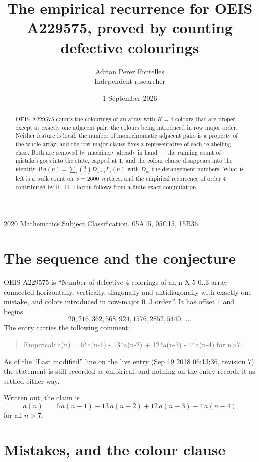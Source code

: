 \documentclass[11pt,a4paper]{article}
\title{The empirical recurrence for OEIS A229575, proved by counting defective colourings}
\author{Adrian Perez Fontelles\\ \small Independent researcher}
\date{1 September 2026}
\theoremstyle{plain}
\theoremstyle{definition}
\begin{document}
\maketitle

\begin{abstract}
OEIS A229575 counts the colourings of an array with $K=4$ colours that are proper except at
exactly one adjacent pair, the colours being introduced in row
major order. Neither feature is local: the number of monochromatic adjacent pairs is a
property of the whole array, and the row major clause fixes a representative of each
relabelling class. Both are removed by machinery already in hand --- the running count of
mistakes goes into the state, capped at $1$, and the colour clause disappears into the
identity $4!\,a(n)=\sum_i\binom{4}{i}D_{4-i}L_i(n)$ with $D_m$ the derangement
numbers. What is left is a walk count on $S=2600$ vertices, and the empirical recurrence of
order $4$ contributed by R.~H.~Hardin follows from a finite exact computation.
\end{abstract}

\noindent\small 2020 Mathematics Subject Classification. 05A15, 05C15, 15B36.\normalsize

\section{The sequence and the conjecture}

OEIS A229575 is ``Number of defective 4-colorings of an n X 5 0..3 array connected horizontally, vertically, diagonally and antidiagonally with exactly one mistake, and colors introduced in row-major 0..3 order.''. It has offset $1$ and begins
\[
20, 216, 362, 568, 924, 1576, 2852, 5440,\ \dots
\]
The entry carries the following comment:
\begin{quote}\small
Empirical: a(n) = 6*a(n-1) - 13*a(n-2) + 12*a(n-3) - 4*a(n-4) for n>7.
\end{quote}
As of the ``Last modified'' line on the live entry (Sep 19 2018 06:13:36, revision 7) the statement is
still recorded as empirical, and nothing on the entry records it as settled either way.

Written out, the claim is
\begin{equation}\label{eq:conj}
a(n)\;=\;6\,a(n-1) - 13\,a(n-2) + 12\,a(n-3) - 4\,a(n-4)
\end{equation}
for all $n>7$.

\section{Mistakes, and the colour clause}
\end{document}
